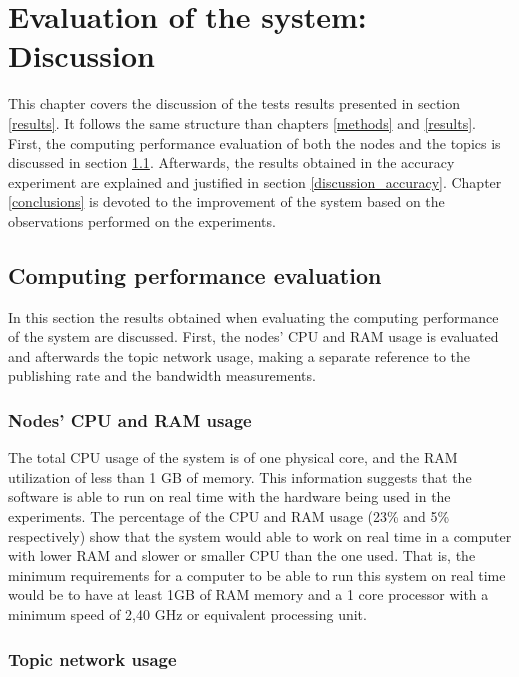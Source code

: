 \chapter{Evaluation of the system: Discussion}
\label{discussion}

This chapter covers the discussion of the tests results presented in section \ref{results}.
It follows the same structure than chapters \ref{methods} and \ref{results}. 
First, the computing performance evaluation of both the nodes and the topics is discussed in section \ref{discussion_computing}. 
Afterwards, the results obtained in the accuracy experiment are explained and justified in section \ref{discussion_accuracy}. 
Chapter \ref{conclusions} is devoted to the improvement of the system based on the observations performed on the experiments. 

\section{Computing performance evaluation}
\label{discussion_computing}
In this section the results obtained when evaluating the computing performance of the system are discussed. 
First, the nodes' CPU and RAM usage is evaluated and afterwards the topic network usage, making a separate reference to the publishing rate and the bandwidth measurements. 

	\subsection{Nodes' CPU and RAM usage}

			The total CPU usage of the system is of one physical core, and the RAM utilization of less than 1 GB of memory. 
			This information suggests that the software is able to run on real time with the hardware being used in the experiments. 
			The percentage of the CPU and RAM usage (23\% and 5\% respectively) show that the system would able to work on real time in a computer with lower RAM and slower or smaller CPU than the one used. 
			That is, the minimum requirements for a computer to be able to run this system on real time would be to have at least 1GB of RAM memory and a 1 core processor with a minimum speed of 2,40 GHz or equivalent processing unit.  


		\subsection{Topic network usage}

